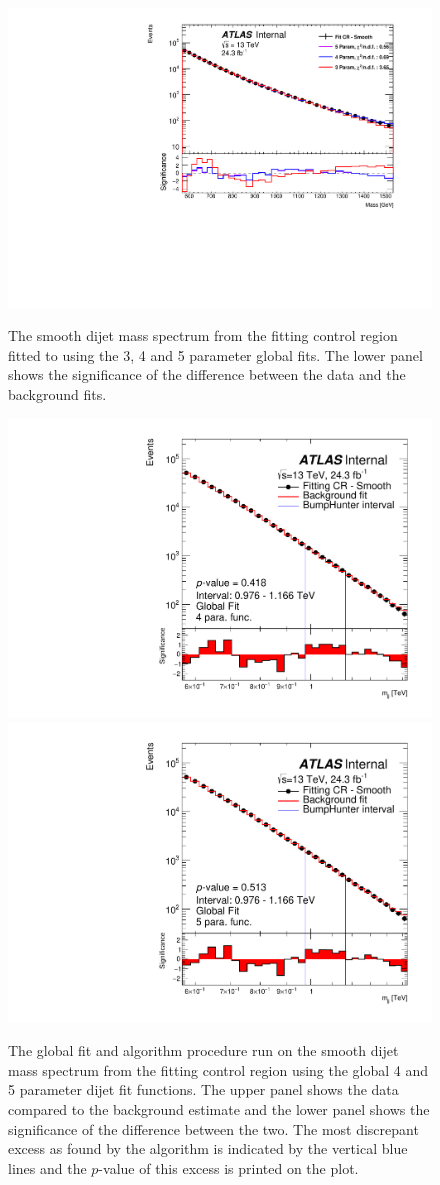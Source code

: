 \begin{figure}[!htb]
\centering
\includegraphics[width=0.6\linewidth, angle=0]{figs/Dibjet/LowMass/FitStudy_min566/globalFit_lm_dh.pdf}
\caption{\label{fig:lowmass_globalFit}
  The smooth dijet mass spectrum from the \lm{} fitting control region
  fitted to using the 3, 4 and 5 parameter global fits.
  The lower panel shows the significance of the difference between the data and the background fits.}
\vspace{1mm}
\captionsetup[subfigure]{aboveskip=0pt,justification=centering}
\centering
{} {
  \includegraphics[width=0.45\linewidth, angle=0]{figs/Dibjet/LowMass/FitStudy_min566/globalFit_lm_bH_4para.pdf}
}
 {
  \includegraphics[width=0.45\linewidth, angle=0]{figs/Dibjet/LowMass/FitStudy_min566/globalFit_lm_bH_5para.pdf}
}

\caption{\label{fig:bhFit_lm_global}
  The global fit and \bh{} algorithm procedure run on the smooth dijet mass spectrum from the \lm{} fitting control region
  using the global 4 and 5 parameter dijet fit functions.
  The upper panel shows the data compared to the background estimate and the lower panel shows the significance of the difference between the two.
  The most discrepant excess as found by the \bh{} algorithm is indicated by the vertical blue lines and the \mbox{$p$-value} of this excess is printed on the plot. }
\end{figure}

